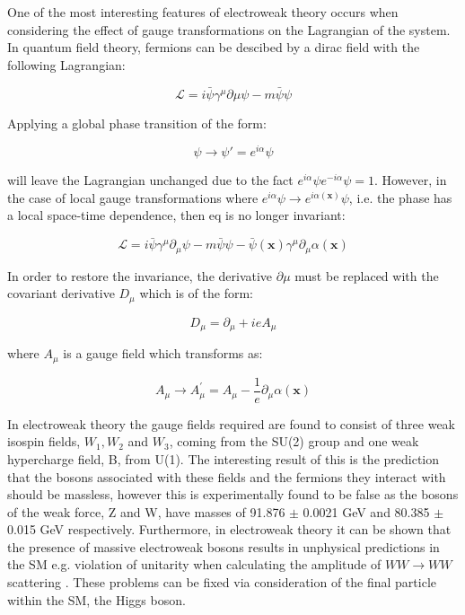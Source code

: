 One of the most interesting features of electroweak theory occurs when considering the effect of gauge transformations on the Lagrangian of the system. In quantum field theory, fermions can be descibed by a dirac field with the following Lagrangian:

\begin{equation}
  \label{eq:diracLagrangian}
\mathscr{L}=i\bar{\psi} \gamma^{\mu} \partial{\mu} \psi  -m\bar{\psi}\psi
\end{equation}

Applying a global phase transition of the form:

\begin{equation}
\psi \rightarrow \psi ' = e^{i\alpha}\psi
\end{equation}

will leave the Lagrangian unchanged due to the fact $e^{i\alpha}\psi e^{-i\alpha}\psi=1$. However, in the case of local gauge transformations where $e^{i\alpha}\psi \rightarrow  e^{i\alpha(\textbf{x})}\psi$, i.e. the phase has a local space-time dependence, then eq is no longer invariant:

\begin{equation}
\mathscr{L}=i\bar{\psi} \gamma^{\mu} \partial{_\mu} \psi  -m\bar{\psi}\psi -\bar{\psi}(\textbf{x})\gamma^{\mu}\partial{_\mu}\alpha(\textbf{x})
\end{equation}

In order to restore the invariance, the derivative $\partial{\mu}$ must be replaced with the covariant derivative $D_{\mu}$ which is of the form:

\begin{equation}
  D_{\mu}=\partial{_\mu}+ieA_{\mu}
\end{equation}

where $A_{\mu}$ is a gauge field which transforms as:

\begin{equation}
  A_{\mu}\rightarrow A_{\mu}^{'} = A_{\mu} - \frac{1}{e}\partial{_\mu}\alpha(\textbf{x})
\end{equation}

In electroweak theory the gauge fields required are found to consist of three weak isospin fields, $W_1, W_2$ and $W_3$,  coming from the SU(2) group and one weak hypercharge field, B, from U(1). The interesting result of this is the prediction that the bosons associated with these fields and the fermions they interact with should be massless, however this is experimentally found to be false as the bosons of the weak force, Z and W, have masses of 91.876 $\pm$ 0.0021 GeV and 80.385 $\pm$ 0.015 GeV respectively. Furthermore, in electroweak theory it can be shown that the presence of massive electroweak bosons results in unphysical predictions in the \ac{SM} e.g. violation of unitarity when calculating the amplitude of $WW\rightarrow WW$ scattering \cite{Szleper:2014xxa}. These problems can be fixed via consideration of the final particle within the \ac{SM}, the Higgs boson.

